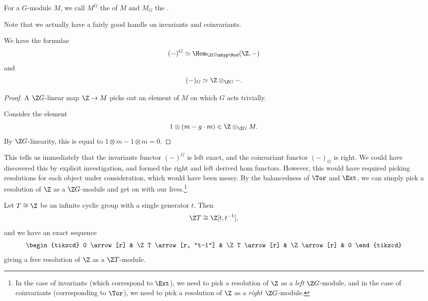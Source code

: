 \documentclass[main.tex]{subfiles}
\begin{document}
\begin{definition}
  \label{def:invariants_coinvariants}
  For a $G$-module $M$, we call $M^{G}$ the  of $M$ and $M_{G}$ the .
\end{definition}

Note that we actually have a fairly good handle on invariants and coinvariants.

\begin{lemma}
  \label{lemma:invariants_and_coinvariants_in_terms_of_tensor_and_hom}
  We have the formulae
  \begin{equation*}
    (-)^{G} \simeq \Hom_{\Z G\mhyp\Mod}(\Z, -)
  \end{equation*}
  and
  \begin{equation*}
    (-)_{G} \simeq \Z \otimes_{\Z G} -.
  \end{equation*}
\end{lemma}
\begin{proof}
  A $\Z G$-linear map $\Z \to M$ picks out an element of $M$ on which $G$ acts trivially.

  Consider the element
  \begin{equation*}
    1 \otimes(m - g\cdot m) \in \Z \otimes_{\Z G} M.
  \end{equation*}
  By $\Z G$-linearity, this is equal to $1 \otimes m - 1 \otimes m = 0$.
\end{proof}

This tells us immediately that the invariants functor $(-)^{G}$ is left exact, and the coinvariant functor $(-)_{G}$ is right. We could have discovered this by explicit investigation, and formed the right and left derived hom functors. However, this would have required picking resolutions for each object under consideration, which would have been messy. By the balancedness of $\Tor$ and $\Ext$, we can simply pick a resolution of $\Z$ as a $\Z G$-module and get on with our lives.\footnote{In the case of invariants (which correspond to $\Ext$), we need to pick a resolution of $\Z$ as a \emph{left} $\Z G$-module, and in the case of coinvariants (corresponding to $\Tor$), we need to pick a resolution of $\Z$ as a \emph{right} $\Z G$-module.}

\begin{example}
  Let $T \cong \Z$ be an infinite cyclic group with a single generator $t$. Then
  \begin{equation*}
    \Z T \cong \Z[t, t^{-1}],
  \end{equation*}
  and we have an exact sequence
  \begin{equation*}
    \begin{tikzcd}
      0
      \arrow[r]
      & \Z T
      \arrow[r, "t-1"]
      & \Z T
      \arrow[r]
      & \Z
      \arrow[r]
      & 0
    \end{tikzcd}
  \end{equation*}
  giving a free resolution of $\Z$ as a $\Z T$-module.
\end{example}
\end{document}

